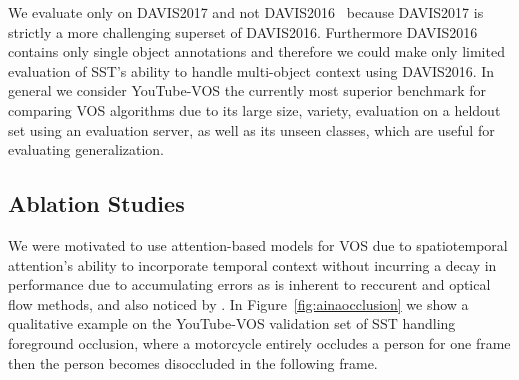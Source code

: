 We evaluate only on DAVIS2017 and not DAVIS2016~\citep{perazzi2016abenchmark}
because DAVIS2017 is strictly a more challenging superset of DAVIS2016.
Furthermore DAVIS2016 contains only single object annotations and therefore we
could make only limited evaluation of SST's ability to handle multi-object
context using DAVIS2016.
In general we consider YouTube-VOS the currently most superior benchmark for
comparing VOS algorithms due to its large size, variety, evaluation on a
heldout set using an evaluation server, as well as its unseen classes, which
are useful for evaluating generalization.




\subsection{Ablation Studies}
\label{sec:yvosablation}


We were motivated to use attention-based models for VOS due to spatiotemporal
attention's ability to incorporate temporal context without incurring a decay
in performance due to accumulating errors as is inherent to reccurent and
optical flow methods, and also noticed by \citet{yang2019anchor}.
In Figure~\ref{fig:ainaocclusion} we show a qualitative example on the
YouTube-VOS validation set of SST handling foreground occlusion, where a
motorcycle entirely occludes a person for one frame then the person becomes
disoccluded in the following frame.

